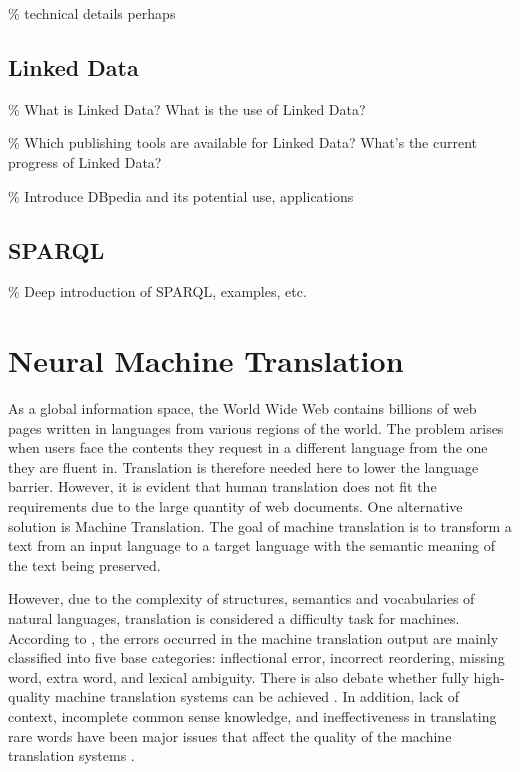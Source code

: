 \% technical details perhaps

\subsection{Linked Data} \label{subsection:linked data}
\% What is Linked Data? What is the use of Linked Data? 

\% Which publishing tools are available for Linked Data? What's the current progress of Linked Data?

\% Introduce DBpedia and its potential use, applications

\subsection{SPARQL} \label{subsection:sparql}
\% Deep introduction of SPARQL, examples, etc.


\section{Neural Machine Translation} \label{section:neural machine translation}
As a global information space, the World Wide Web contains billions of web pages written in languages from various regions of the world. The problem arises when users face the contents they request in a different language from the one they are fluent in. Translation is therefore needed here to lower the language barrier. However, it is evident that human translation does not fit the requirements due to the large quantity of web documents. One alternative solution is Machine Translation. The goal of machine translation is to transform a text from an input language to a target language with the semantic meaning of the text being preserved.

However, due to the complexity of structures, semantics and vocabularies of natural languages, translation is considered a difficulty task for machines. According to \cite{Popovic2012}, the errors occurred in the machine translation output are mainly classified into five base categories: inflectional error, incorrect reordering, missing word, extra word, and lexical ambiguity. There is also debate whether fully high-quality machine translation systems can be achieved \cite{bar1964language}. In addition, lack of context, incomplete common sense knowledge, and ineffectiveness in translating rare words have been major issues that affect the quality of the machine translation systems \cite{okpor2014machine} \cite{Wu2016}.

